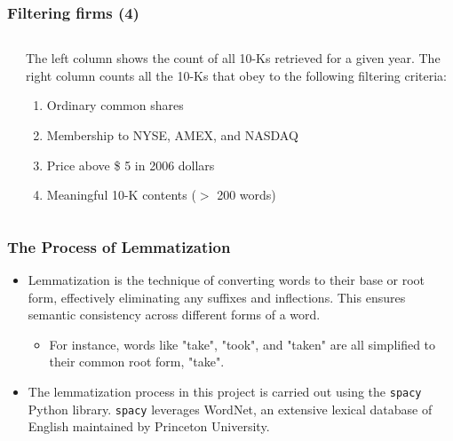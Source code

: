 \documentclass{beamer}
\newcommand{\ffo}{dicfullmc10thr10defnob40noa1_4t}
\begin{document}
\begin{frame}
\frametitle{Filtering firms (4)}
\scriptsize
    \begin{columns}[T]
    \begin{column}{0.5\textwidth}

    \end{column}

    \begin{column}{0.5\textwidth}
    \normalsize
    The left column shows the count of all 10-Ks retrieved for a given year. The right column counts all the 10-Ks that obey to the following filtering criteria: 
    \begin{enumerate}
   \item Ordinary common shares
   \item  	Membership to NYSE, AMEX, and NASDAQ
   \item Price above \$ 5 in 2006 dollars
   \item Meaningful 10-K contents ($>$ 200 words)
    \end{enumerate}
    \end{column}
    \end{columns}
\end{frame}


\begin{frame}
\frametitle{The Process of Lemmatization}
\begin{itemize}
\item Lemmatization is the technique of converting words to their base or root form, effectively eliminating any suffixes and inflections. This ensures semantic consistency across different forms of a word.
\begin{itemize}
  \item For instance, words like "take", "took", and "taken" are all simplified to their common root form, "take".
\end{itemize}
\item The lemmatization process in this project is carried out using the \texttt{spacy} Python library. \texttt{spacy} leverages WordNet, an extensive lexical database of English maintained by Princeton University. 
\end{itemize}
\end{frame}
\end{document}

